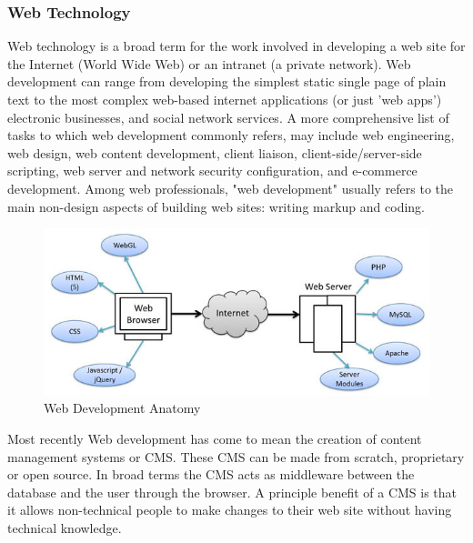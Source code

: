 \subsubsection{Web Technology}


Web technology is a broad term for the work involved in developing a web site for the Internet (World Wide Web) or an intranet (a private network). Web development can range from developing the simplest static single page of plain text to the most complex web-based internet applications (or just 'web apps') electronic businesses, and social network services. A more comprehensive list of tasks to which web development commonly refers, may include web engineering, web design, web content development, client liaison, client-side/server-side scripting, web server and network security configuration, and e-commerce development. Among web professionals, "web development" usually refers to the main non-design aspects of building web sites: writing markup and coding. 

\begin{figure}[ht]
\centering
\includegraphics[scale=0.48]{images/WebTechnology.jpg}
\caption{Web Development Anatomy}
\label{fig:Anatomy}
\end{figure}

Most recently Web development has come to mean the creation of content management systems or CMS. These CMS can be made from scratch, proprietary or open source. In broad terms the CMS acts as middleware between the database and the user through the browser. A principle benefit of a CMS is that it allows non-technical people to make changes to their web site without having technical knowledge.

